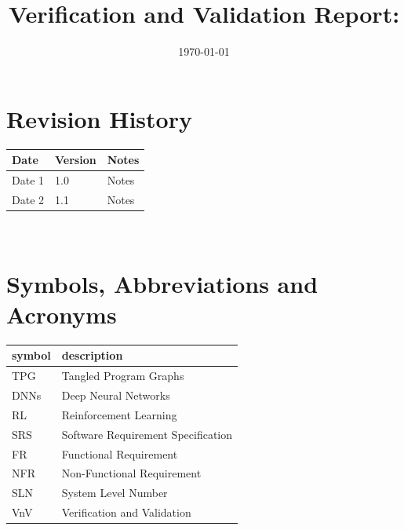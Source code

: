 \documentclass[12pt, titlepage]{article}
\begin{document}
\title{Verification and Validation Report: \progname} 
\author{\authname}
\date{\today}
	
\maketitle


\section{Revision History}

\begin{tabularx}{\textwidth}{p{3cm}p{2cm}X}
\toprule {\bf Date} & {\bf Version} & {\bf Notes}\\
\midrule
Date 1 & 1.0 & Notes\\
Date 2 & 1.1 & Notes\\
\bottomrule
\end{tabularx}

~\newpage

\section{Symbols, Abbreviations and Acronyms}

\renewcommand{\arraystretch}{1.2}
\begin{tabular}{l l} 
  \toprule		
  \textbf{symbol} & \textbf{description}\\
  \midrule 
  TPG & Tangled Program Graphs\\
  DNNs & Deep Neural Networks\\
  RL & Reinforcement Learning\\
  SRS & Software Requirement Specification\\
  FR & Functional Requirement\\
  NFR & Non-Functional Requirement\\
  SLN & System Level Number\\
  VnV & Verification and Validation\\
  \bottomrule
\end{tabular}\\


\newpage

\tableofcontents

\listoftables %
\end{document}
